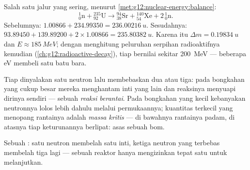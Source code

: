 \begin{example}\label{ex:g12:nuclear-energy:fissionbalance}
Salah satu jalur yang sering, menurut \cref{met:g12:nuclear-energy:balance}:
\[
{}^{1}_{0}\mathrm{n} + {}^{235}_{92}\mathrm{U} \longrightarrow
{}^{94}_{38}\mathrm{Sr} + {}^{140}_{54}\mathrm{Xe} + 2\,{}^{1}_{0}\mathrm{n}.
\]
Sebelumnya: $1.00866 + 234.99350 = \qty{236.00216}{u}$. Sesudahnya:
$93.89450 + 139.89200 + 2 \times 1.00866 = \qty{235.80382}{u}$. Karena itu
$\Delta m = \qty{0.19834}{u}$ dan $E \approx \qty{185}{MeV}$; dengan menghitung
peluruhan serpihan radioaktifnya kemudian (\cref{ch:g12:radioactive-decay}),
tiap  bernilai sekitar \qty{200}{MeV} --- beberapa \unit{eV} membeli satu 
batu bara.
\end{example}

\begin{definition}\label{def:g12:nuclear-energy:chain}
Tiap  dinyalakan satu neutron lalu membebaskan dua atau tiga: pada bongkahan
yang cukup besar mereka menghantam inti yang lain dan reaksinya menyuapi dirinya sendiri ---
sebuah \emph{reaksi berantai}. Pada bongkahan yang kecil kebanyakan
neutronnya lolos lebih dahulu melalui permukaannya; kuantitas terkecil yang menopang rantainya
adalah \emph{massa kritis} --- di bawahnya rantainya
padam, di atasnya tiap keturunannya berlipat: asas sebuah bom.
\end{definition}

\begin{omfigure}

{\small Sebuah : satu neutron membelah satu inti, ketiga neutron
yang terbebas membelah tiga lagi --- sebuah reaktor hanya mengizinkan tepat satu untuk melanjutkan.}
\end{omfigure}

